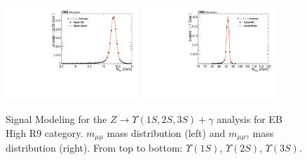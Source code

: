 \begin{figure}[!htbp]
\begin{center}
\includegraphics[width=0.45\textwidth]{figures/fitPlotFiles2D/ZToUpsilonPhotonSignalAndBackgroundFit/mMuMNU_ZToUpsilon3SPhotonSignalAndBackgroundFit_Signal_Cat1}\hspace*{1.cm}
\includegraphics[width=0.45\textwidth]{figures/fitPlotFiles2D/ZToUpsilonPhotonSignalAndBackgroundFit/mHZ_ZToUpsilon3SPhotonSignalAndBackgroundFit_Signal_Cat1_default}\hspace*{1.cm}


\end{center}\vspace*{-.5cm}
\caption{Signal Modeling for the $Z \rightarrow \Upsilon(1S,2S,3S) +\gamma$ analysis for EB High R9 category. $m_{\mu\mu}$ mass distribution (left) and $m_{\mu\mu\gamma}$ mass distribution (right). From top to bottom: $\Upsilon(1S)$, $\Upsilon(2S)$, $\Upsilon(3S)$.}
\label{fig:ZToUpsilon_Signal_Cat1}
\end{figure}

